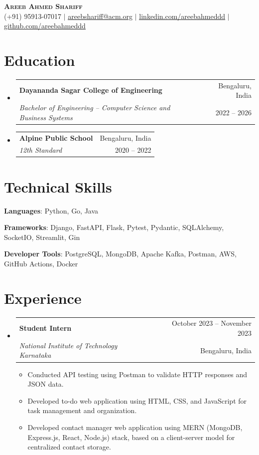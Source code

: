 \documentclass[a4paper,11pt]{article}
\makeatletter
\newcommand{\resumeItem}[1]{\item\small{#1 \vspace{-2pt}}}
\newcommand{\resumePosition}[4]{
    \vspace{-2pt}\item
    \begin{tabular*}{0.97\textwidth}[t]{l@{\extracolsep{\fill}}r}
        \textbf{#1} & #2 \\
        \textit{\small#3} & \small #4 \\
    \end{tabular*}\vspace{-7pt}
}
\newcommand{\resumeSubHeadingListStart}{\begin{itemize}[leftmargin=0.15in, label={}]}
\newcommand{\resumeSubHeadingListEnd}{\end{itemize}}
\newcommand{\resumeItemListStart}{\begin{itemize}}
\newcommand{\resumeItemListEnd}{\end{itemize}\vspace{-5pt}}
\makeatother
\begin{document}
\begin{center}
    \textbf{\Huge \scshape Areeb Ahmed Shariff} \\ \vspace{1pt}
    \small (+91) 95913-07017 $|$ \href{mailto:areebshariff@acm.org}{\underline{areebshariff@acm.org}} $|$
    \href{https://linkedin.com/in/areebahmeddd}{\underline{linkedin.com/areebahmeddd}} $|$
    \href{https://github.com/areebahmeddd}{\underline{github.com/areebahmeddd}}
\end{center}

\section{Education}
\resumeSubHeadingListStart
    \resumePosition
        {Dayananda Sagar College of Engineering}{Bengaluru, India}
        {Bachelor of Engineering -- Computer Science and Business Systems}{2022 -- 2026}
    \resumePosition
        {Alpine Public School}{Bengaluru, India}
        {12th Standard}{2020 -- 2022}
\resumeSubHeadingListEnd

\section{Technical Skills}
\begin{itemize}[leftmargin=0.15in, label={}, itemsep=-2pt]
    \small{
        \item{\textbf{Languages}{: Python, Go, Java}}
        \item{\textbf{Frameworks}{: Django, FastAPI, Flask, Pytest, Pydantic, SQLAlchemy, SocketIO, Streamlit, Gin}}
        \item{\textbf{Developer Tools}{: PostgreSQL, MongoDB, Apache Kafka, Postman, AWS, GitHub Actions, Docker}}
    }
\end{itemize}

\section{Experience}
\resumeSubHeadingListStart
    \resumePosition
        {Student Intern}{October 2023 -- November 2023}
        {National Institute of Technology Karnataka}{Bengaluru, India}
    \resumeItemListStart
        \resumeItem{Conducted API testing using Postman to validate HTTP responses and JSON data.}
        \resumeItem{Developed to-do web application using HTML, CSS, and JavaScript for task management and organization.}
        \resumeItem{Developed contact manager web application using MERN (MongoDB, Express.js, React, Node.js) stack, based on a client-server model for centralized contact storage.}
    \resumeItemListEnd
\resumeSubHeadingListEnd
\end{document}
